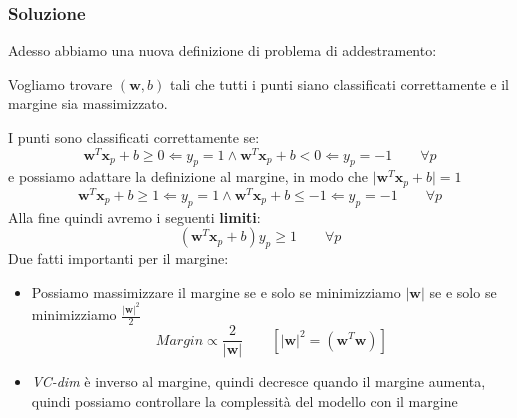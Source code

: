 \subsubsection{Soluzione}
Adesso abbiamo una nuova definizione di problema di addestramento:
\begin{definition}
	\label{def:trainingprob}
	Vogliamo trovare $(\mathbf{w},b)$ tali che tutti i punti siano classificati correttamente e il margine sia massimizzato.
\end{definition}
I punti sono classificati correttamente se:
\begin{equation*}
	\mathbf{w}^T\mathbf{x}_p + b \geq 0 \Leftarrow y_p = 1\land \mathbf{w}^T\mathbf{x}_p + b < 0 \Leftarrow y_p = -1 \quad\quad \forall p
\end{equation*}
e possiamo adattare la definizione al margine, in modo che $\lvert \mathbf{w}^T \mathbf{x}_p + b \rvert = 1$
\begin{equation*}
	\mathbf{w}^T\mathbf{x}_p + b \geq 1 \Leftarrow y_p = 1\land \mathbf{w}^T\mathbf{x}_p + b \leq -1 \Leftarrow y_p = -1 \quad\quad \forall p
\end{equation*}
Alla fine quindi avremo i seguenti \textbf{limiti}:
\begin{equation}
	\label{eq:constraints}
	(\mathbf{w}^T \mathbf{x}_p + b)y_p \geq 1 \quad\quad \forall p
\end{equation}
Due fatti importanti per il margine:
\begin{itemize}
	\item Possiamo massimizzare il margine se e solo se minimizziamo $\lvert \mathbf{w} \rvert $ se e solo se minimizziamo $\frac{\lvert \mathbf{w} \rvert ^2}{2}$
	\begin{equation}
		\label{eq:trainprobprim}
		Margin \propto \frac{2}{\lvert \mathbf{w} \rvert} \quad\quad [\lvert \mathbf{w}\rvert^2 = (\mathbf{w}^T\mathbf{w})]
	\end{equation}
	\item \textit{VC-dim} è inverso al margine, quindi decresce quando il margine aumenta, quindi possiamo controllare la complessità del modello con il margine
\end{itemize}
